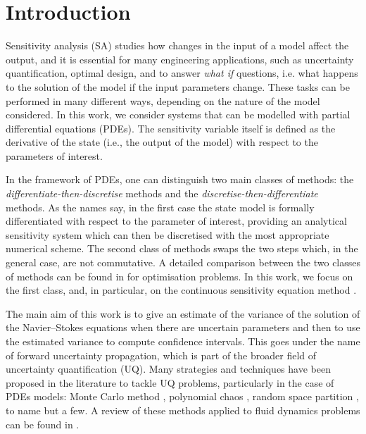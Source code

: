 \vspace{2cm}
\chapter{Introduction}
Sensitivity analysis (SA) studies how changes in the input of a model affect the output, and it is essential for many engineering applications, such as uncertainty quantification, optimal design, and to answer \textit{what if} questions, i.e. what happens to the solution of the model if the input parameters change. These tasks can be performed in many different ways, depending on the nature of the model considered. In this work, we consider systems that can be modelled with partial differential equations (PDEs). The sensitivity variable itself is defined as the derivative of the state (i.e., the output of the model) with respect to the parameters of interest. 

In the framework of PDEs, one can distinguish two main classes of methods: the \textit{differentiate-then-discretise} methods and the \textit{discretise-then-differentiate} methods. As the names say, in the first case the state model is formally differentiated with respect to the parameter of interest, providing an analytical sensitivity system which can then be discretised with the most appropriate numerical scheme. The second class of methods swaps the two steps which, in the general case, are not commutative. A detailed comparison between the two classes of methods can be found in \cite{gunzburger2003perspectives} for optimisation problems. 
In this work, we focus on the first class, and, in particular, on the continuous sensitivity equation method \cite{Borggaard1997366,duvigneau2006improved,Duvigneau_Pelletier_06_ijcfd,chalons2018sensitivity, SA_Euler}.

The main aim of this work is to give an estimate of the variance of the solution of the Navier--Stokes equations when there are uncertain parameters and then to use the estimated variance to compute confidence intervals. This goes under the name of forward uncertainty propagation, which is part of the broader field of uncertainty quantification (UQ). Many strategies and techniques have been proposed in the literature to tackle UQ problems, particularly in the case of PDEs models: Monte Carlo method \cite{christian1999monte}, polynomial chaos \cite{Walters_03, Xiu_et_Karniadakis_03, Knio_LeMaitre_06, Despres2013}, random space partition \cite{abgrall_congedo_13}, to name but a few. A review of these methods applied to fluid dynamics problems can be found in \cite{walters2002uncertainty}. 

